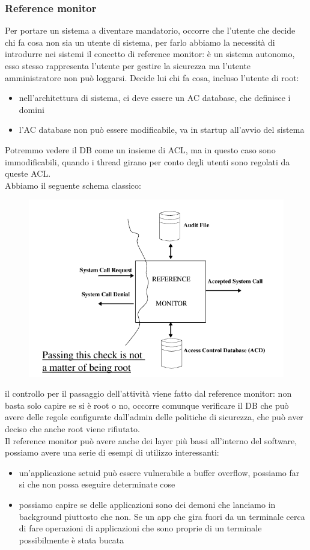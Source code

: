 \documentclass[12pt, oneside]{extbook}
\begin{document}
\subsubsection{Reference monitor}
Per portare un sistema a diventare mandatorio, occorre che l'utente che decide chi fa cosa non sia un utente di sistema, per farlo abbiamo la necessità di introdurre nei sistemi il concetto di reference monitor: è un sistema autonomo, esso stesso rappresenta l'utente per gestire la sicurezza ma l'utente amministratore non può loggarsi. Decide lui chi fa cosa, incluso l'utente di root:
\begin{itemize}
	\item  nell'architettura di sistema, ci deve essere un AC database, che definisce i domini
	\item l'AC database non può essere modificabile, va in startup all'avvio del sistema
\end{itemize}
Potremmo vedere il DB come un insieme di ACL, ma in questo caso sono immodificabili, quando i thread girano per conto degli utenti sono regolati da queste ACL.\\Abbiamo il seguente schema classico:
\begin{figure}[!h]
	\includegraphics[scale=0.5]{immagini/reference_monitor_schema.png}
\end{figure}
il controllo per il passaggio dell'attività viene fatto dal reference monitor: non basta solo capire se si è root o no, occorre comunque verificare il DB che può avere delle regole configurate dall'admin delle politiche di sicurezza, che può aver deciso che anche root viene rifiutato.\\Il reference monitor può avere anche dei layer più bassi all'interno del software, possiamo avere una serie di esempi di utilizzo interessanti:
\begin{itemize}
	\item un'applicazione setuid può essere vulnerabile a buffer overflow, possiamo far si che non possa eseguire determinate cose
	\item possiamo capire se delle applicazioni sono dei demoni che lanciamo in background piuttosto che non. Se un app che gira fuori da un terminale cerca di fare operazioni di applicazioni che sono proprie di un terminale possibilmente è stata bucata
\end{itemize}
\end{document}
